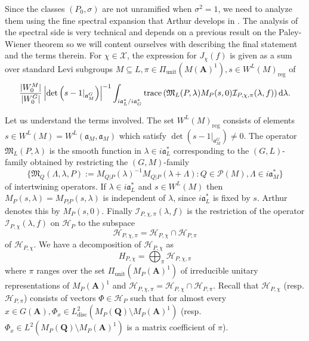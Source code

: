 \documentclass[11pt]{amsart}
\def\A{\mathbf A}
\def\Q{\mathbf Q}
\def\HHH{\mathcal H}
\def\III{\mathcal I}
\def\MMM{\mathfrak M}	%
\def\PPP{\mathcal P}
\def\XXX{\mathcal X}
\def\aaa{\mathfrak a}
\def\d{\text d}
\def\bs{\setminus} 			%
\def\det{\operatorname{det}}
\def\Ltwo{L^2}
\def\mod#1{\lvert #1 \rvert} %
\def\reg{\operatorname{reg}}
\def\trace{\operatorname{trace}}
\def\unit{\operatorname{unit}}
\theoremstyle{remark}
\begin{document}
Since the classes $(P_0, \sigma)$ are not unramified when $\sigma^2 = 1$, we need to analyze them using the fine spectral expansion that Arthur develops in \cite{MR681738}. The analysis of the spectral side is very technical and depends on a previous result on the Paley-Wiener theorem \cite{MR697608} so we will content ourselves with describing the final statement and the terms therein. 
For $\chi \in \XXX$, the expression for $J_\chi(f)$ is given as a sum over standard Levi subgroups $M \subseteq L, \pi \in \Pi_{\text{unit}}(M(\A)^1), s \in W^L(M)_{\reg}$ of 
\begin{equation} \label{fine_spec} 
	\frac{\mod{W_0^M}}{\mod{W_0^G}} \left| \det \left(s - 1|_{\aaa_M^G} \right) \right|^{-1} 
		\int_{i\aaa_L^* / i\aaa_G^*} \trace \left( \MMM_L(P, \lambda) M_P(s, 0) \III_{P, \chi, \pi}(\lambda, f) \right) \d \lambda. 
\end{equation}

Let us understand the terms involved. The set $W^L(M)_{\reg}$ consists of elements $s \in W^L(M) = W^L(\aaa_M, \aaa_M)$ which satisfy $\det(s-1|_{\aaa_M^G}) \neq 0$. The operator $\MMM_L(P, \lambda)$ is the smooth function in $\lambda \in i\aaa_L^*$ corresponding to the $(G, L)$-family obtained by restricting the $(G, M)$-family 
\[ \{ \MMM_Q(\Lambda, \lambda, P) := M_{Q|P}(\lambda)^{-1} M_{Q|P}(\lambda + \Lambda) : Q \in \PPP(M), \Lambda \in i\aaa_M^* \} \]
of intertwining operators. If $\lambda \in i\aaa_L^*$ and $s \in W^L(M)$ then $M_P(s, \lambda) = M_{P|P}(s, \lambda)$ is independent of $\lambda$, since $i\aaa_L^*$ is fixed by $s$. Arthur denotes this by $M_P(s, 0)$. Finally $\III_{P, \chi, \pi}(\lambda, f)$ is the restriction of the operator $\III_{P, \chi}(\lambda, f)$ on $\HHH_P$ to the subspace 
\[ \HHH_{P, \chi, \pi} = \HHH_{P, \chi} \cap \HHH_{P, \pi} \]
of $\HHH_{P, \chi}$. We have a decomposition of $\HHH_{P, \chi}$ as
\[ H_{P, \chi} = \bigoplus_\pi \HHH_{P, \chi, \pi} \]
where $\pi$ ranges over the set $\Pi_{\unit}(M_P(\A)^1)$ of irreducible unitary representations of $M_P(\A)^1$ and $\HHH_{P, \chi, \pi} = \HHH_{P, \chi} \cap \HHH_{P, \pi}$. Recall that $\HHH_{P, \chi}$ (resp. $\HHH_{P, \pi}$) consists of vectors $\Phi \in \HHH_P$ such that for almost every $x \in G(\A), \Phi_x \in \Ltwo_{\text{disc}}(M_P(\Q)\bs M_P(\A)^1)$ (resp. $\Phi_x \in \Ltwo(M_P(\Q)\bs M_P(\A)^1)$ is a matrix coefficient of $\pi$). 
\end{document}
